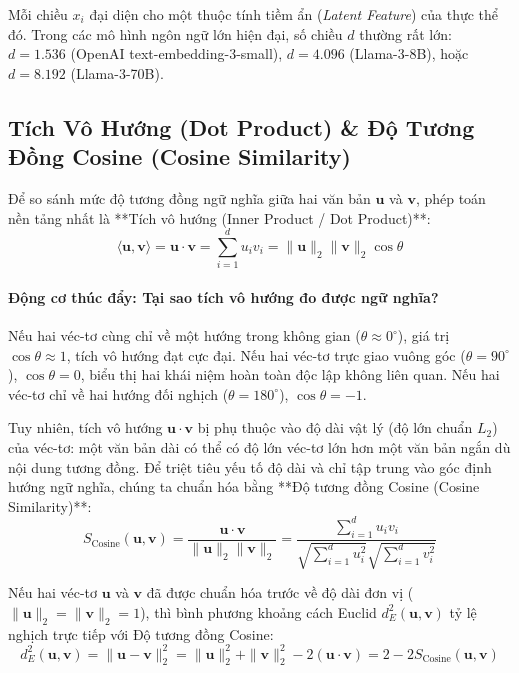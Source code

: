 Mỗi chiều $x_i$ đại diện cho một thuộc tính tiềm ẩn (\textit{Latent Feature}) của thực thể đó. Trong các mô hình ngôn ngữ lớn hiện đại, số chiều $d$ thường rất lớn: $d = 1.536$ (OpenAI text-embedding-3-small), $d = 4.096$ (Llama-3-8B), hoặc $d = 8.192$ (Llama-3-70B).

\subsection{Tích Vô Hướng (Dot Product) \& Độ Tương Đồng Cosine (Cosine Similarity)}

Để so sánh mức độ tương đồng ngữ nghĩa giữa hai văn bản $\mathbf{u}$ và $\mathbf{v}$, phép toán nền tảng nhất là **Tích vô hướng (Inner Product / Dot Product)**:
\begin{equation}
\langle \mathbf{u}, \mathbf{v} \rangle = \mathbf{u} \cdot \mathbf{v} = \sum_{i=1}^d u_i v_i = \|\mathbf{u}\|_2 \|\mathbf{v}\|_2 \cos \theta
\label{eq:dot-product-def}
\end{equation}

\paragraph{Động cơ thúc đẩy: Tại sao tích vô hướng đo được ngữ nghĩa?}
Nếu hai véc-tơ cùng chỉ về một hướng trong không gian ($\theta \approx 0^\circ$), giá trị $\cos \theta \approx 1$, tích vô hướng đạt cực đại. Nếu hai véc-tơ trực giao vuông góc ($\theta = 90^\circ$), $\cos \theta = 0$, biểu thị hai khái niệm hoàn toàn độc lập không liên quan. Nếu hai véc-tơ chỉ về hai hướng đối nghịch ($\theta = 180^\circ$), $\cos \theta = -1$.

Tuy nhiên, tích vô hướng $\mathbf{u} \cdot \mathbf{v}$ bị phụ thuộc vào độ dài vật lý (độ lớn chuẩn $L_2$) của véc-tơ: một văn bản dài có thể có độ lớn véc-tơ lớn hơn một văn bản ngắn dù nội dung tương đồng. Để triệt tiêu yếu tố độ dài và chỉ tập trung vào góc định hướng ngữ nghĩa, chúng ta chuẩn hóa bằng **Độ tương đồng Cosine (Cosine Similarity)**:
\begin{equation}
S_{\text{Cosine}}(\mathbf{u}, \mathbf{v}) = \frac{\mathbf{u} \cdot \mathbf{v}}{\|\mathbf{u}\|_2 \|\mathbf{v}\|_2} = \frac{\sum_{i=1}^d u_i v_i}{\sqrt{\sum_{i=1}^d u_i^2} \sqrt{\sum_{i=1}^d v_i^2}}
\label{eq:cosine-similarity-def}
\end{equation}

\begin{theorem}
Nếu hai véc-tơ $\mathbf{u}$ và $\mathbf{v}$ đã được chuẩn hóa trước về độ dài đơn vị ($\|\mathbf{u}\|_2 = \|\mathbf{v}\|_2 = 1$), thì bình phương khoảng cách Euclid $d_E^2(\mathbf{u}, \mathbf{v})$ tỷ lệ nghịch trực tiếp với Độ tương đồng Cosine:
\begin{equation}
d_E^2(\mathbf{u}, \mathbf{v}) = \|\mathbf{u} - \mathbf{v}\|_2^2 = \|\mathbf{u}\|_2^2 + \|\mathbf{v}\|_2^2 - 2(\mathbf{u} \cdot \mathbf{v}) = 2 - 2 S_{\text{Cosine}}(\mathbf{u}, \mathbf{v})
\label{eq:euclidean-cosine-relation}
\end{equation}
\end{theorem}


